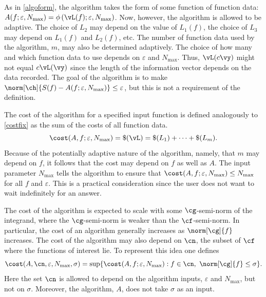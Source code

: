 \documentclass[]{elsarticle}
\theoremstyle{definition}
\theoremstyle{remark}
\begin{document}
As in \eqref{algoform}, the algorithm takes the form of some function of function data: $A(f;\varepsilon,N_{\max}) = \phi\left(\vL(f);\varepsilon,N_{\max}\right)$.
Now, however, the algorithm is allowed to be adaptive. The choice of $L_2$ may depend on the value of $L_1(f)$, the choice of $L_3$ may depend on $L_1(f)$ and $L_2(f)$, etc.  The number of function data used by the algorithm, $m$, may also be determined adaptively. The choice of how many and which function data to use depends on $\varepsilon$ and $N_{\max}$.  Thus, $\vL(c\vy)$ might not equal $c\vL(\vy)$ since the length of the information vector depends on the data recorded.  The goal of the algorithm is to make $\norm[\ch]{S(f) - A(f;\varepsilon,N_{\max})} \le \varepsilon$, but this is not a requirement of the definition.

The cost of the algorithm for a specified input function is defined analogously to \eqref{costfix} as the sum of the costs of all function data.
\[
\cost(A,f;\varepsilon,N_{\max}) = \$(\vL) = \$(L_1) + \cdots +\$(L_m).
\]
Because of the potentially adaptive nature of the algorithm, namely, that $m$ may depend on $f$, it follows that the cost may depend on $f$ as well as $A$. The input parameter $N_{\max}$ tells the algorithm to ensure that $\cost(A,f;\varepsilon,N_{\max}) \le N_{\max}$ for all $f$ and $\varepsilon$.  This is a practical consideration since the user does not want to wait indefinitely for an answer.  

The cost of the algorithm is expected to scale with some $\cg$-semi-norm of the integrand, where the $\cg$-semi-norm is weaker than the $\cf$-semi-norm.  In particular, the cost of an algorithm generally increases as $\norm[\cg]{f}$ increases.  The cost of the algorithm may also depend on $\cn$, the subset of $\cf$ where the functions of interest lie.  To represent this idea one defines
\begin{equation*}
\cost(A,\cn,\varepsilon,N_{\max},\sigma)
= \sup \{ \cost(A,f;\varepsilon,N_{\max}) : f \in \cn, \ \norm[\cg]{f} \le \sigma \} .
\end{equation*}
Here the set $\cn$ is allowed to depend on the algorithm inputs, $\varepsilon$ and $N_{\max}$, but not on $\sigma$.  Moreover, the algorithm, $A$, does not take $\sigma$ as an input.
\end{document}

